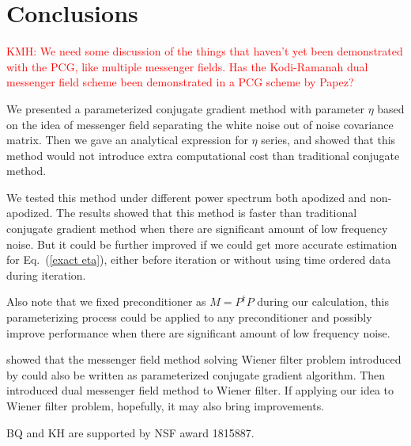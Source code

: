 \documentclass[twocolumn,linenumbers]{aastex631}
\newcommand{\Pdagger}{P^{\dagger}}
\newcommand{\kmh}[1]{\textcolor{red}{KMH: #1}}
\begin{document}

\section{Conclusions} \label{sec:conclusions} 

\kmh{We need some discussion of the things that haven't yet been demonstrated with the PCG, like multiple messenger fields.  Has the Kodi-Ramanah dual messenger field scheme been demonstrated in a PCG scheme by Papez?}

We presented a parameterized conjugate gradient method with parameter $\eta$ based on the idea of messenger field
separating the white noise out of noise covariance matrix.
Then we gave an analytical expression for $\eta$ series,
and showed that this method would not introduce extra computational cost than traditional conjugate method.

We tested this method under different power spectrum both apodized and non-apodized.
The results showed that this method is faster than traditional conjugate gradient method 
when there are significant amount of low frequency noise.
But it could be further improved if we could get more accurate estimation for Eq.~(\ref{exact eta}),
either before iteration or without using time ordered data during iteration.

Also note that we fixed preconditioner as $M = \Pdagger P$ during our calculation,
this parameterizing process could be applied to any preconditioner and possibly improve performance when 
there are significant amount of low frequency noise.

\citet{2018A&A...620A..59P} showed that the messenger field method solving Wiener
filter problem introduced by \cite{2013A&A...549A.111E} could also be written as 
parameterized conjugate gradient algorithm.
Then \citet{2017MNRAS.468.1782K} introduced dual messenger field method to Wiener filter.
If applying our idea to Wiener filter problem, hopefully, it may also bring improvements.













\begin{acknowledgments}
BQ and KH are supported by NSF award 1815887.
\end{acknowledgments}
\end{document}

